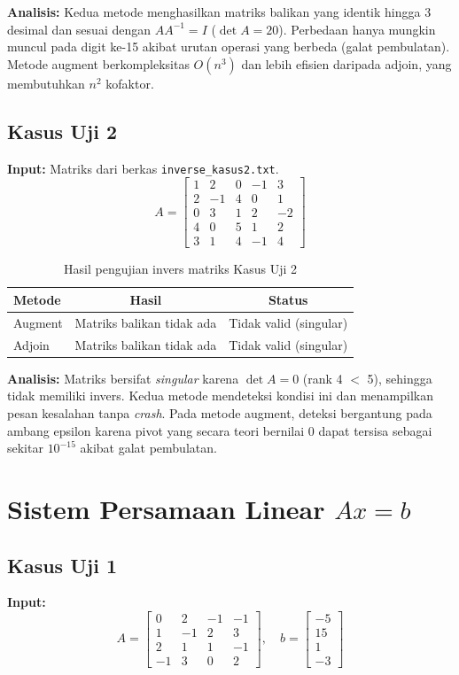 \documentclass[12pt,a4paper]{report}
\begin{document}
\textbf{Analisis:} Kedua metode menghasilkan matriks balikan yang identik hingga 3 desimal dan sesuai dengan $AA^{-1}=I$ ($\det A = 20$). Perbedaan hanya mungkin muncul pada digit ke-15 akibat urutan operasi yang berbeda (galat pembulatan). Metode augment berkompleksitas $O(n^3)$ dan lebih efisien daripada adjoin, yang membutuhkan $n^2$ kofaktor.

\subsection{Kasus Uji 2}
\textbf{Input:} Matriks dari berkas \texttt{inverse\_kasus2.txt}.
\[
A = \begin{bmatrix}
    1 &2 &0 &-1 &3 \\
    2 &-1 &4 &0 &1 \\ 
    0 &3 &1 &2 &-2 \\ 
    4 &0 &5 &1 &2 \\    
    3 &1 &4 &-1 &4
\end{bmatrix}
\]
 
\begin{table}[H]
    \centering
    \caption{Hasil pengujian invers matriks Kasus Uji 2}
    \begin{tabular}{|l|c|c|}
        \hline
        \textbf{Metode} & \textbf{Hasil} & \textbf{Status} \\
        \hline
        Augment & Matriks balikan tidak ada & Tidak valid (singular) \\
        Adjoin  & Matriks balikan tidak ada & Tidak valid (singular) \\
        \hline
    \end{tabular}
\end{table}
 
\textbf{Analisis:} Matriks bersifat \emph{singular} karena $\det A = 0$ (rank 4 $<$ 5), sehingga tidak memiliki invers. Kedua metode mendeteksi kondisi ini dan menampilkan pesan kesalahan tanpa \emph{crash}. Pada metode augment, deteksi bergantung pada ambang epsilon karena pivot yang secara teori bernilai 0 dapat tersisa sebagai sekitar $10^{-15}$ akibat galat pembulatan.

\section{Sistem Persamaan Linear $Ax = b$}
 
\subsection{Kasus Uji 1}
\textbf{Input:}
\[
A = \begin{bmatrix} 0 & 2 & -1 & -1 \\ 1 & -1 & 2 & 3 \\ 2 & 1 & 1 & -1 \\ -1 & 3 & 0 & 2 \end{bmatrix},
\quad
b = \begin{bmatrix} -5 \\ 15 \\ 1 \\ -3 \end{bmatrix}
\]
 
\end{document}
